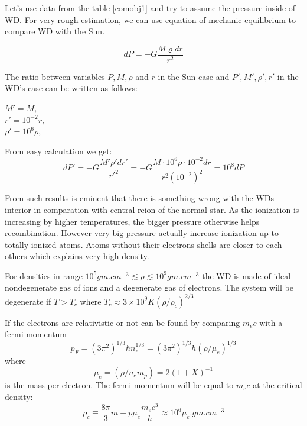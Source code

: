 \documentclass[oneside,a4paper,11pt]{report}
\begin{document}
Let's use data from the table \ref{comobj1} and try to assume the pressure inside of WD. For very 
rough estimation, we can use equation of mechanic equilibrium to compare WD with the Sun.

\begin{equation}
 dP = -G\frac{M \varrho  dr}{r^2}
\end{equation}

The ratio between variables $P, M, \rho$ and $r$ in the Sun case and $P', M', \rho', r'$ in the WD's 
case can be written as follows:

\begin{center}
 $M' = M ,$  \\
 $r' = 10^{-2}r,$ \\
 $\rho' = 10^6 \rho,$ \\
\end{center}

From easy calculation we get: 
\begin{equation}
 dP' = -G\frac{M' \rho' dr'}{r'^2} = -G\frac{M \cdot 10^6 \rho \cdot 10^{-2} dr}{r^2 (10^{-2})^2} = 10^{8} dP
\end{equation}

From such results is eminent that there is something wrong with the WDs interior in comparation with central reion of the 
normal star. As the ionization is increasing by higher temperatures, the bigger pressure otherwise helps recombination. However 
very big pressure actually increase ionization up to totally ionized atoms. Atoms without their 
electrons shells are closer to each others which explains very high density.

For densities in range $10^5 gm.cm^{-3} \lesssim \rho \lesssim 10^9 gm.cm^{-3}$ the WD is made 
of ideal nondegenerate gas of ions and a degenerate gas of electrons. The system will be degenerate 
if $T>T_c$ where $T_c \approx 3 \times 10^9 K (\rho / \rho_c)^{2/3} $ 

If the electrons are relativistic or not can be found by comparing $m_e c$ with a fermi momentum
\begin{equation}
 p_F = (3\pi^2)^{1/3}\hbar n_e^{1/3} = (3\pi^2)^{1/3}\hbar (\rho/\mu_e)^{1/3}
\end{equation}
 where 
\begin{equation}
 \mu_e = (\rho / n_e m_p) = 2(1+X)^{-1}
\end{equation}
is the mass per electron. The fermi momentum will be equal to $m_e c$ at the critical density:
\begin{equation}
\rho_c \equiv \frac{8\pi}{3}m+p \mu_e \frac{m_ec^3}{h} \approx 10^6 \mu_e.gm.cm^{-3}
\end{equation}
\end{document}
